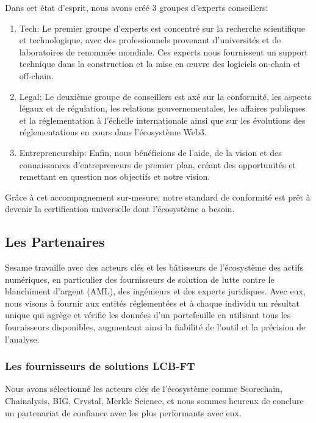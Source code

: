 ﻿\documentclass[a4paper]{article}
\begin{document}
Dans cet état d’esprit, nous avons créé 3 groupes d’experts conseillers:

\begin{enumerate}
\item Tech: Le premier groupe d’experts est concentré sur la recherche scientifique et technologique, avec des professionnels provenant d'universités et de laboratoires de renommée mondiale. Ces experts nous fournissent un support technique dans la construction et la mise en œuvre des logiciels on-chain et off-chain.

\item Legal: Le deuxième groupe de conseillers est axé sur la conformité, les aspects légaux et de régulation, les relations gouvernementales, les affaires publiques et la réglementation à l'échelle internationale ainsi que sur les évolutions des réglementations en cours dans l'écosystème Web3.

\item Entrepreneurship: Enfin, nous bénéficions de l'aide, de la vision et des connaissances d'entrepreneurs de premier plan, créant des opportunités et remettant en question nos objectifs et notre vision.
\end{enumerate}

Grâce à cet accompagnement sur-mesure, notre standard de conformité est prêt à devenir la certification universelle dont l'écosystème a besoin.

\subsection{Les Partenaires}
Sesame travaille avec des acteurs clés et les bâtisseurs de l'écosystème des actifs numériques, en particulier des fournisseurs de solution de lutte contre le blanchiment d'argent (AML), des ingénieurs et des experts juridiques. Avec eux, nous visons à fournir aux entités réglementées et à chaque individu un résultat unique qui agrège et vérifie les données d'un portefeuille en utilisant tous les fournisseurs disponibles, augmentant ainsi la fiabilité de l’outil et la précision de l’analyse.

\subsubsection{Les fournisseurs de solutions LCB-FT}
Nous avons sélectionné les acteurs clés de l'écosystème comme Scorechain, Chainalysis, BIG, Crystal, Merkle Science,  et nous sommes heureux de conclure un partenariat de confiance avec les plus performants avec eux.
\end{document}
